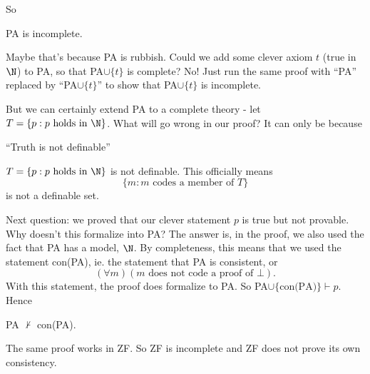 \documentclass[a4paper]{article}
\begin{document}
So
\begin{thm}
  PA is incomplete.
\end{thm}

Maybe that's because PA is rubbish. Could we add some clever axiom $t$ (true in $\N$) to PA, so that PA$\cup \{t\}$ is complete? No! Just run the same proof with ``PA'' replaced by ``PA$\cup \{t\}$'' to show that PA$\cup\{t\}$ is incomplete.

But we can certainly extend PA to a complete theory - let $T = \{p: p\text{ holds in }\N\}$. What will go wrong in our proof? It can only be because
\begin{thm}
  ``Truth is not definable''

  $T= \{p: p\text{ holds in }\N\}$ is not definable. This officially means
  \[
    \{m: m\text{ codes a member of }T\}
  \]
  is not a definable set.
\end{thm}

Next question: we proved that our clever statement $p$ is true but not provable. Why doesn't this formalize into PA? The answer is, in the proof, we also used the fact that PA has a model, $\N$. By completeness, this means that we used the statement con(PA), ie. the statement that PA is consistent, or
\[
  (\forall m)(m\text{ does not code a proof of }\bot).
\]
With this statement, the proof does formalize to PA. So PA$\cup \{\text{con(PA)}\}\vdash p$. Hence
\begin{thm}[]
  PA $\not \vdash$ con(PA).
\end{thm}

The same proof works in ZF. So ZF is incomplete and ZF does not prove its own consistency.
\end{document}
